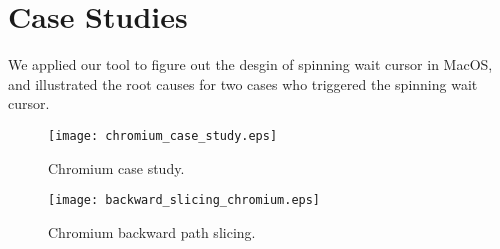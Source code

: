 \section{Case Studies} \label{sec:casestudy}
We applied our tool to figure out the desgin of spinning wait cursor in MacOS,
and illustrated the root causes for two cases who triggered the spinning wait cursor.



\begin{figure}[tb]
    \centering
    \texttt{[image: chromium\_case\_study.eps]}
    \caption{Chromium case study.}
    \label{fig:chromium-trace}
\end{figure}

\begin{figure}[tb]
    \centering
    \texttt{[image: backward\_slicing\_chromium.eps]}
    \caption{Chromium backward path slicing.}
    \label{fig:path-slice-on-chromium}
\end{figure}



